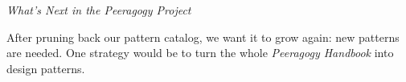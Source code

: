 \smallskip

\begin{framed}
\noindent 
\emph{What's Next in the Peeragogy Project}
\begin{collectinmacro}{\ScrapbookWN}{}{}
After pruning back our pattern catalog, we want it to grow again: new patterns are needed.
One strategy would be to turn the whole \emph{Peeragogy Handbook} into design patterns.
\end{collectinmacro}
\ScrapbookWN
\end{framed}


